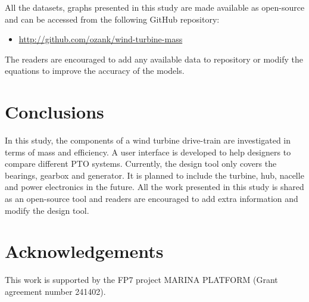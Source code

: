 \documentclass{article}\usepackage{graphicx, color}
\begin{document}
All the datasets, graphs presented in this study are made available as open-source and can be accessed from the following GitHub repository: 

\begin{itemize}
  \item \url{http://github.com/ozank/wind-turbine-mass}
\end{itemize}

The readers are encouraged to add any available data to repository or modify the equations to improve the accuracy of the models.

\section{Conclusions}

In this study, the components of a wind turbine drive-train are investigated in terms of mass and efficiency. A user interface is developed to help designers to compare different PTO systems.  Currently, the design tool only covers the bearings, gearbox and generator. It is planned to include the turbine, hub, nacelle and power electronics in the future. All the work presented in this study is shared as an open-source tool and readers are encouraged to add extra information and modify the design tool.

\section*{Acknowledgements}
This work is supported by the FP7 project MARINA PLATFORM (Grant agreement number 241402). 



\noindent
\end{document}
